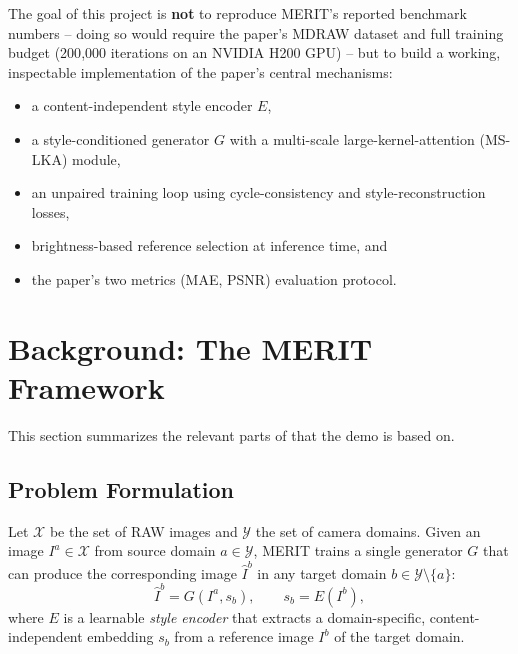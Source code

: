 \documentclass[11pt]{article}
\begin{document}
The goal of this project is \textbf{not} to reproduce MERIT's reported
benchmark numbers -- doing so would require the paper's MDRAW dataset and
full training budget (200{,}000 iterations on an NVIDIA H200 GPU) -- but
to build a working, inspectable implementation of the paper's central
mechanisms:
\begin{itemize}[nosep]
    \item a content-independent style encoder $E$,
    \item a style-conditioned generator $G$ with a multi-scale
          large-kernel-attention (MS-LKA) module,
    \item an unpaired training loop using cycle-consistency and
          style-reconstruction losses,
    \item brightness-based reference selection at inference time, and
    \item the paper's two metrics (MAE, PSNR) evaluation protocol.
\end{itemize}

\section{Background: The MERIT Framework}

This section summarizes the relevant parts of \cite{merit2026} that the
demo is based on.

\subsection{Problem Formulation}
Let $\mathcal{X}$ be the set of RAW images and $\mathcal{Y}$ the set of
camera domains. Given an image $I^a \in \mathcal{X}$ from source domain
$a \in \mathcal{Y}$, MERIT trains a single generator $G$ that can produce
the corresponding image $\hat{I}^b$ in any target domain
$b \in \mathcal{Y} \setminus \{a\}$:
\begin{equation}
    \hat{I}^b = G(I^a, s_b), \qquad s_b = E(I^b),
\end{equation}
where $E$ is a learnable \emph{style encoder} that extracts a
domain-specific, content-independent embedding $s_b$ from a reference
image $I^b$ of the target domain.
\end{document}
